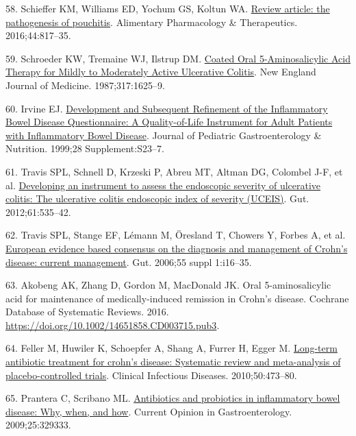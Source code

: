 \documentclass[
  12pt,
  a4paper,
  twoside,
  openright]{book}
\newlength{\cslhangindent}
\newlength{\cslentryspacingunit} %
\newenvironment{CSLReferences}[2] %
 {%
  \setlength{\parindent}{0pt}
  \ifodd #1
  \let\oldpar\par
  \def\par{\hangindent=\cslhangindent\oldpar}
  \fi
  \setlength{\parskip}{#2\cslentryspacingunit}
 }%
 {}
\begin{document}
\begin{CSLReferences}{0}{0}
\leavevmode{}%
58. Schieffer KM, Williams ED, Yochum GS, Koltun WA. \href{https://doi.org/10.1111/apt.13780}{Review article: the pathogenesis of pouchitis}. Alimentary Pharmacology \& Therapeutics. 2016;44:817--35.

\leavevmode{}%
59. Schroeder KW, Tremaine WJ, Ilstrup DM. \href{https://doi.org/10.1056/nejm198712243172603}{Coated Oral 5-Aminosalicylic Acid Therapy for Mildly to Moderately Active Ulcerative Colitis}. New England Journal of Medicine. 1987;317:1625--9.

\leavevmode{}%
60. Irvine EJ. \href{https://doi.org/10.1097/00005176-199904001-00003}{Development and Subsequent Refinement of the Inflammatory Bowel Disease Questionnaire: A Quality-of-Life Instrument for Adult Patients with Inflammatory Bowel Disease}. Journal of Pediatric Gastroenterology \& Nutrition. 1999;28 Supplement:S23--7.

\leavevmode{}%
61. Travis SPL, Schnell D, Krzeski P, Abreu MT, Altman DG, Colombel J-F, et al. \href{https://doi.org/10.1136/gutjnl-2011-300486}{Developing an instrument to assess the endoscopic severity of ulcerative colitis: The ulcerative colitis endoscopic index of severity (UCEIS)}. Gut. 2012;61:535--42.

\leavevmode{}%
62. Travis SPL, Stange EF, Lémann M, Öresland T, Chowers Y, Forbes A, et al. \href{https://doi.org/10.1136/gut.2005.081950b}{European evidence based consensus on the diagnosis and management of Crohn{'}s disease: current management}. Gut. 2006;55 suppl 1:i16--35.

\leavevmode{}%
63. Akobeng AK, Zhang D, Gordon M, MacDonald JK. Oral 5{-}aminosalicylic acid for maintenance of medically{-}induced remission in Crohn's disease. Cochrane Database of Systematic Reviews. 2016. \url{https://doi.org/10.1002/14651858.CD003715.pub3}.

\leavevmode{}%
64. Feller M, Huwiler K, Schoepfer A, Shang A, Furrer H, Egger M. \href{https://doi.org/10.1086/649923}{Long-term antibiotic treatment for crohn's disease: Systematic review and meta-analysis of placebo-controlled trials}. Clinical Infectious Diseases. 2010;50:473--80.

\leavevmode{}%
65. Prantera C, Scribano ML. \href{https://doi.org/10.1097/MOG.0b013e32832b20bf}{Antibiotics and probiotics in inflammatory bowel disease: Why, when, and how}. Current Opinion in Gastroenterology. 2009;25:329333.


\end{CSLReferences}
\end{document}

